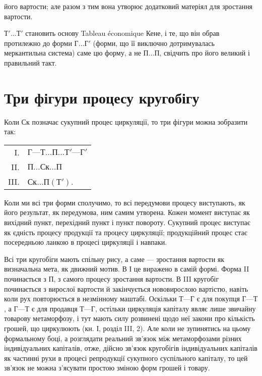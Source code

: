 \parcont{}  %
його вартости; але разом з тим вона утворює додатковий матеріял для
зростання вартости.

$Т'\dots{} Т'$ становить основу Tableau économique Кене, і те, що він
обрав протилежно до форми $Г\dots{} Г'$ (форми, що її виключно дотримувалась
меркантильна система) саме цю форму, а не $П\dots{} П$, свідчить про
його великий і правильний такт.

\section{Три фігури процесу кругобігу}

Коли Ск позначає сукупний процес циркуляції, то три фігури можна
зобразити так:
  \begin{table}[h]
    \begin{tabularx}{\textwidth}{r l}
      I. & $Г — Т\dots{} П\dots{} Т' — Г'$\\

      II. & $П\dots{} Ск\dots{} П$\\

      III. & $Ск\dots{} П (Т')$.\\
    \end{tabularx}
  \end{table}
Коли ми всі три форми сполучимо, то всі передумови процесу виступають,
як його результат, як передумова, ним самим утворена. Кожен
момент виступає як вихідний пункт, перехідний пункт і пункт повороту.
Сукупний процес виступає як єдність процесу продукції та процесу
циркуляції; продукційний процес стає посередньою ланкою в процесі
циркуляції і навпаки.

Всі три кругобіги мають спільну рису, а саме — зростання вартости як
визначальна мета, як движний мотив. В І це виражено в самій формі.
Форма II починається з $П$, з самого процесу зростання вартости.
В III кругобіг починається з вирослої вартости й закінчується нововирослою
вартістю, навіть коли рух повторюється в незмінному маштабі.
Оскільки $Т — Г$ є для покупця $Г — Т$, а $Г — Т$ є для продавця $Т — Г$,
остільки циркуляція капіталу являє лише звичайну товарову метаморфозу,
і тут мають силу розвинені щодо неї закони про кількість грошей, що
циркулюють (кн. І, розділ III, 2). Але коли не зупинятись на цьому
формальному боці, а розглядати реальний зв’язок між метаморфозами
різних індивідуальних капіталів, отже, дійсно зв’язок кругобігів індивідуальних
капіталів як частинні рухи в процесі репродукції сукупного
суспільного капіталу, то цей зв’язок не можна з’ясувати простою зміною
форм грошей і товару.

